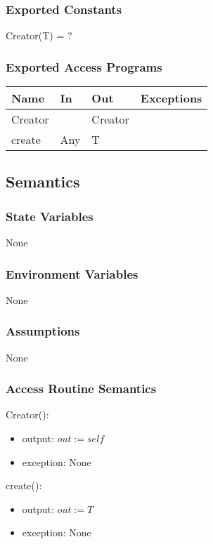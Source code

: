 \documentclass[12pt, titlepage]{article}
\begin{document}
\subsubsection{Exported Constants}
Creator(T) = ?
\subsubsection{Exported Access Programs}

\begin{center}
	\begin{tabular}{p{2cm} p{4cm} p{4cm} p{2cm}}
		\hline
		\textbf{Name} & \textbf{In} & \textbf{Out} & \textbf{Exceptions} \\
		\hline
		Creator &  & Creator &  \\
		create & Any & T &  \\
		\hline
	\end{tabular}
\end{center}

\subsection{Semantics}

\subsubsection{State Variables}
None

\subsubsection{Environment Variables}
None
\subsubsection{Assumptions}
None
\subsubsection{Access Routine Semantics}

\noindent Creator():
\begin{itemize}
	\item output: $out := self$
	\item exception: None
\end{itemize}

\noindent create():
\begin{itemize}
	\item output: $out := T$
	\item exception: None
\end{itemize}
\end{document}
